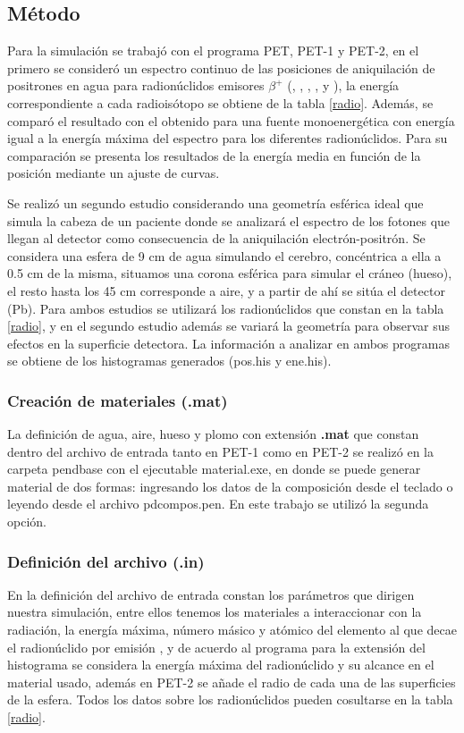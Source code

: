 \documentclass[12pt,a4paper,onecolumn]{article}
\begin{document}
\subsection*{Método}
Para la simulación se trabajó con el programa PET, PET-1 y PET-2, en el primero se consideró un espectro continuo de las posiciones de aniquilación de positrones en agua para radionúclidos emisores $\beta^+$ (, , , ,  y ), la energía correspondiente a cada radioisótopo se obtiene de la tabla \ref{radio}. Además, se comparó el resultado con el obtenido para una fuente monoenergética con energía igual a la energía máxima del espectro para los diferentes radionúclidos. Para su comparación se presenta los resultados de la energía media en función de la posición mediante un ajuste de curvas.
  
Se realizó un segundo estudio considerando una geometría esférica ideal que simula la cabeza de un paciente donde se analizará el espectro de los fotones que llegan al detector como consecuencia de la aniquilación electrón-positrón. Se considera una esfera de 9 cm de agua simulando el cerebro, concéntrica a ella a 0.5 cm de la misma, situamos una corona esférica para simular el cráneo (hueso), el resto hasta los 45 cm corresponde a aire, y a partir de ahí se sitúa el detector (Pb). Para ambos estudios se utilizará los radionúclidos que constan en la tabla \ref{radio}, y en el segundo estudio además se variará la geometría para observar sus efectos en la superficie detectora. La información a analizar en ambos programas se obtiene de los histogramas generados (pos.his y ene.his).

\subsubsection*{Creación de materiales (.mat)}
La definición de agua, aire, hueso y plomo con extensión \textbf{.mat} que constan dentro del archivo de entrada tanto en PET-1 como en PET-2 se realizó en la carpeta pendbase con el ejecutable material.exe, en donde se puede generar material de dos formas: ingresando los datos de la composición desde el teclado o leyendo desde el archivo pdcompos.pen. En este trabajo se utilizó la segunda opción.

\subsubsection*{Definición del archivo (.in)}
En la definición del archivo de entrada constan los parámetros que dirigen nuestra simulación, entre ellos tenemos los materiales a interaccionar con la radiación, la energía máxima, número másico y atómico del elemento al que decae el radionúclido por emisión \ce{\beta^+}, y de acuerdo al programa para la extensión del histograma se considera la energía máxima del radionúclido y su alcance en el material usado, además en PET-2 se añade el radio de cada una de las superficies de la esfera. Todos los datos sobre los radionúclidos pueden cosultarse en la tabla \ref{radio}.
\end{document}
